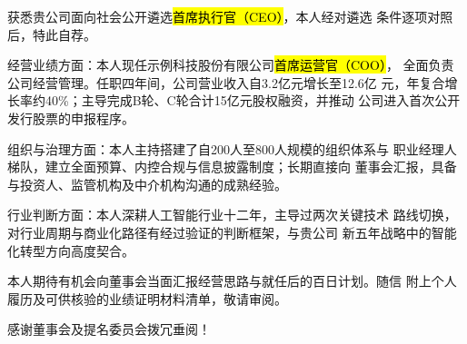 \documentclass[zihao=-4]{ctexart}
\begin{document}


获悉贵公司面向社会公开遴选\hl{首席执行官（CEO）}，本人经对遴选
条件逐项对照后，特此自荐。

经营业绩方面：本人现任示例科技股份有限公司\hl{首席运营官（COO）}，
全面负责公司经营管理。任职四年间，公司营业收入自3.2亿元增长至12.6亿
元，年复合增长率约40\%；主导完成B轮、C轮合计15亿元股权融资，并推动
公司进入首次公开发行股票的申报程序。

组织与治理方面：本人主持搭建了自200人至800人规模的组织体系与
职业经理人梯队，建立全面预算、内控合规与信息披露制度；长期直接向
董事会汇报，具备与投资人、监管机构及中介机构沟通的成熟经验。

行业判断方面：本人深耕人工智能行业十二年，主导过两次关键技术
路线切换，对行业周期与商业化路径有经过验证的判断框架，与贵公司
新五年战略中的智能化转型方向高度契合。

本人期待有机会向董事会当面汇报经营思路与就任后的百日计划。随信
附上个人履历及可供核验的业绩证明材料清单，敬请审阅。

感谢董事会及提名委员会拨冗垂阅！

\ltClosing

\end{document}
